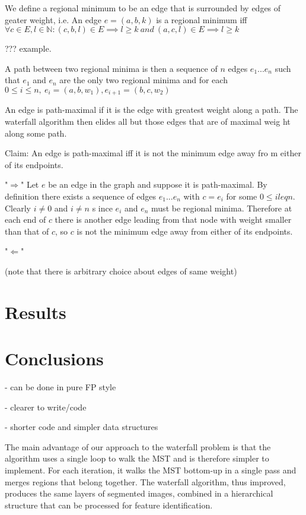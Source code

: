 \documentclass{jfp}
\begin{document}
We define a regional minimum to be an edge that is surrounded by edges of geater 
weight, i.e.
An edge $e = (a,b,k)$ is a regional minimum iff
$\forall c \in E, l \in \mathbb{N} :
  (c,b,l) \in E \implies l \geq k\ and\
  (a,c,l) \in E \implies l \geq k $

??? example.

A path between two regional minima is then a sequence of $n$ edges $e_1 ... e_n$
such that $e_1$ and $e_n$ are the only two regional minima
and for each $ 0 \leq i \le n,\ e_i = (a,b,w_1) , e_{i+1} = (b,c,w_2)$

\noindent An edge is path-maximal if it is the edge with greatest weight along a
 path.
The waterfall algorithm then elides all but those edges that are of maximal weig
ht along some path.

\noindent Claim: An edge is path-maximal iff it is not the minimum edge away fro
m either of its endpoints.


\noindent "$\Rightarrow$"
\indent
  Let $e$ be an edge in the graph and suppose it is path-maximal.
  By definition there exists a sequence of edges $e_1 ... e_n$
  with $c = e_i$ for some $ 0 \leq i leq n$. Clearly $i \neq 0$ and $i \neq n$ s
ince
  $e_i$ and $e_n$ must be regional minima. Therefore at each end of $c$ there is
 another edge
  leading from that node with weight smaller than that of $c$, so $c$ is
  not the minimum edge away from either of its endpoints.

"$\Leftarrow$"



(note that there is arbitrary choice about edges of same weight)




\section{Results}


\section{Conclusions}

 - can be done in pure FP style

 - clearer to write/code

 - shorter code and simpler data structures


The main advantage of our approach to the waterfall problem is that
the algorithm uses a single loop to walk the MST and is therefore
simpler to implement. For each iteration, it walks the MST bottom-up
in a single pass and merges regions that belong together. The
waterfall algorithm, thus improved, produces the same layers of
segmented images, combined in a hierarchical structure that can be
processed for feature identification.
\end{document}
